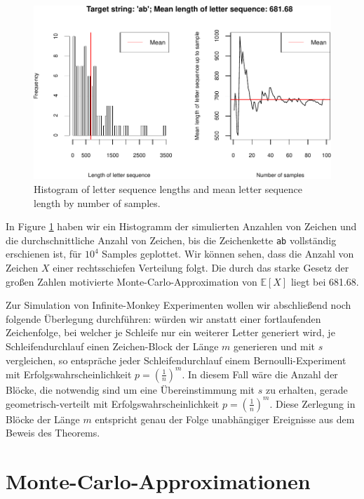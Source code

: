 \documentclass[10pt,]{article}
\begin{document}
\begin{figure}[htbp]
\centering
\includegraphics{project1_files/figure-latex/Infinite-Monkey Simulation-1.pdf}
\caption{Histogram of letter sequence lengths and mean letter sequence
length by number of samples.\label{fig:plotMonkey}}
\end{figure}

In Figure \ref{fig:plotMonkey} haben wir ein Histogramm der simulierten
Anzahlen von Zeichen und die durchschnittliche Anzahl von Zeichen, bis
die Zeichenkette \texttt{\textquotesingle{}ab\textquotesingle{}}
vollständig erschienen ist, für \(10^4\) Samples geplottet. Wir können
sehen, dass die Anzahl von Zeichen \(X\) einer rechtsschiefen Verteilung
folgt. Die durch das starke Gesetz der großen Zahlen motivierte
Monte-Carlo-Approximation von \(\mathbb{E}[X]\) liegt bei 681.68.

Zur Simulation von Infinite-Monkey Experimenten wollen wir abschließend
noch folgende Überlegung durchführen: würden wir anstatt einer
fortlaufenden Zeichenfolge, bei welcher je Schleife nur ein weiterer
Letter generiert wird, je Schleifendurchlauf einen Zeichen-Block der
Länge \(m\) generieren und mit \(s\) vergleichen, so entspräche jeder
Schleifendurchlauf einem Bernoulli-Experiment mit
Erfolgswahrscheinlichkeit \(p = \left( \frac{1}{n} \right)^m\). In
diesem Fall wäre die Anzahl der Blöcke, die notwendig sind um eine
Übereinstimmung mit \(s\) zu erhalten, gerade geometrisch-verteilt mit
Erfolgswahrscheinlichkeit \(p = \left( \frac{1}{n} \right)^m\). Diese
Zerlegung in Blöcke der Länge \(m\) entspricht genau der Folge
unabhängiger Ereignisse aus dem Beweis des Theorems.

\newpage

\section{Monte-Carlo-Approximationen}\label{monte-carlo-approximationen}
\end{document}
